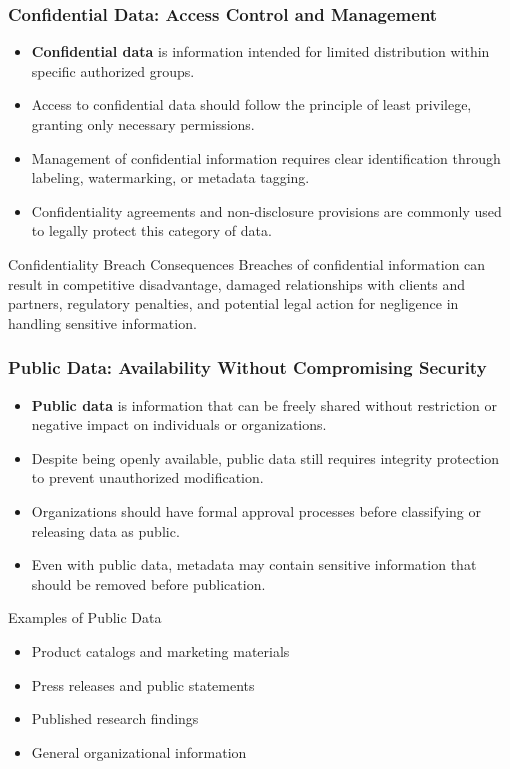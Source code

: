 \documentclass{beamer}
\begin{document}
\begin{frame}
\frametitle{Confidential Data: Access Control and Management}
\begin{itemize}
\item \textbf{Confidential data} is information intended for limited distribution within specific authorized groups.
\item Access to confidential data should follow the principle of least privilege, granting only necessary permissions.
\item Management of confidential information requires clear identification through labeling, watermarking, or metadata tagging.
\item Confidentiality agreements and non-disclosure provisions are commonly used to legally protect this category of data.
\end{itemize}

\begin{alertblock}{Confidentiality Breach Consequences}
Breaches of confidential information can result in competitive disadvantage, damaged relationships with clients and partners, regulatory penalties, and potential legal action for negligence in handling sensitive information.
\end{alertblock}
\end{frame}

\begin{frame}
\frametitle{Public Data: Availability Without Compromising Security}
\begin{itemize}
\item \textbf{Public data} is information that can be freely shared without restriction or negative impact on individuals or organizations.
\item Despite being openly available, public data still requires integrity protection to prevent unauthorized modification.
\item Organizations should have formal approval processes before classifying or releasing data as public.
\item Even with public data, metadata may contain sensitive information that should be removed before publication.
\end{itemize}

\begin{block}{Examples of Public Data}
\begin{itemize}
\item Product catalogs and marketing materials
\item Press releases and public statements
\item Published research findings
\item General organizational information
\end{itemize}
\end{block}
\end{frame}
\end{document}
